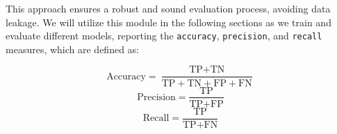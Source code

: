 This approach ensures a robust and sound evaluation process, avoiding data leakage. We will utilize this module in the following sections as we train and evaluate different models, reporting the \texttt{accuracy}, \texttt{precision}, and \texttt{recall} measures, which are defined as:

\begin{equation}
    \text{Accuracy} = \frac{\text{TP} + \text{TN}}{\text{TP} + \text{TN} + \text{FP} + \text{FN}}
\end{equation}
\begin{equation}
    \text{Precision} = \frac{\text{TP}}{\text{TP} + \text{FP}}
\end{equation}
\begin{equation}
    \text{Recall} = \frac{\text{TP}}{\text{TP} + \text{FN}}
\end{equation}



